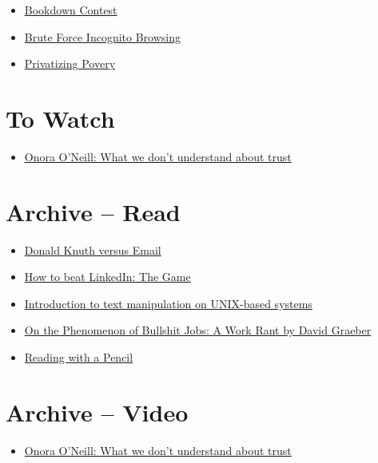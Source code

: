 \documentclass[]{book}
\providecommand{\tightlist}{%
  \setlength{\itemsep}{0pt}\setlength{\parskip}{0pt}}
\theoremstyle{definition}
\theoremstyle{definition}
\theoremstyle{definition}
\theoremstyle{remark}
\begin{document}
\begin{itemize}
\tightlist
\item
  \href{https://community.rstudio.com/tags/bookdown-contest}{Bookdown
  Contest}
\item
  \href{https://nullprogram.com/blog/2018/09/06/}{Brute Force Incognito
  Browsing}
\item
  \href{https://thebaffler.com/salvos/privatizing-poverty-phillips-fein}{Privatizing
  Povery}
\end{itemize}

\section{To Watch}\label{to-watch}

\begin{itemize}
\tightlist
\item
  \href{https://www.ted.com/talks/onora_o_neill_what_we_don_t_understand_about_trust}{Onora
  O'Neill: What we don't understand about trust}
\end{itemize}

\section{Archive -- Read}\label{archive-read}

\begin{itemize}
\tightlist
\item
  \href{https://www-cs-faculty.stanford.edu/~knuth/email.html}{Donald
  Knuth versus Email}
\item
  \href{https://theoutline.com/post/5495/how-to-beat-linked-in-the-game}{How
  to beat LinkedIn: The Game}
\item
  \href{https://www.ibm.com/developerworks/aix/library/au-unixtext/index.html}{Introduction
  to text manipulation on UNIX-based systems}
\item
  \href{http://www.strikemag.org/bullshit-jobs/}{On the Phenomenon of
  Bullshit Jobs: A Work Rant by David Graeber}
\item
  \href{https://austinkleon.com/2018/08/30/reading-with-a-pencil/}{Reading
  with a Pencil}
\end{itemize}

\section{Archive -- Video}\label{archive-video}

\begin{itemize}
\tightlist
\item
  \href{https://www.ted.com/talks/onora_o_neill_what_we_don_t_understand_about_trust}{Onora
  O'Neill: What we don't understand about trust}
\end{itemize}
\end{document}
